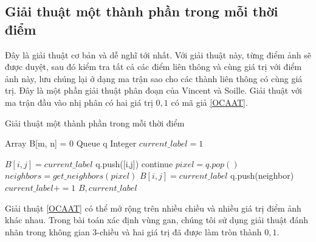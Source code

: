 \subsection{Giải thuật một thành phần trong mỗi thời điểm}
Đây là giải thuật cơ bản và dễ nghĩ tới nhất. Với giải thuật này, từng điểm ảnh sẽ được duyệt, sau đó kiểm tra tất cả các điểm liên thông và cùng giá trị với điểm ảnh này, lưu chúng lại ở dạng ma trận sao cho các thành liên thông có cùng giá trị. Đây là một phần giải thuật phân đoạn của Vincent và Soille\cite{87344}. Giải thuật với ma trận đầu vào nhị phân có hai giá trị $0, 1$ có mã giả \ref{OCAAT}.\\
\begin{algorithm}
  \caption{Giải thuật một thành phần trong mỗi thời điểm}\label{OCAAT}
  \begin{algorithmic}[1]
    \State Array B[m, n] = 0 
    \State Queue q 
    \State Integer $current\_label = 1$
    
             
                \State $B[i,j] = current\_label$ 
                \State q.push([i,j])
            \Else
                \State continue
            \EndIf
                \State $pixel = q.pop()$
                \State $neighbors = get\_neighbors(pixel)$
                        \State $B[i,j] = current\_label$
                        \State q.push(neighbor)
                    \EndIf
                \EndFor
            \EndWhile
            \State $current\_label += 1$
        \EndFor   
    \EndFor
    \Return $B, current\_label$
    \EndProcedure
  \end{algorithmic}
\end{algorithm}
Giải thuật \ref{OCAAT} có thể mở rộng trên nhiều chiều và nhiều giá trị điểm ảnh khác nhau. Trong bài toán xác định vùng gan, chúng tôi sử dụng giải thuật đánh nhãn trong không gian 3-chiều và hai giá trị đã được làm tròn thành $0,1$.

